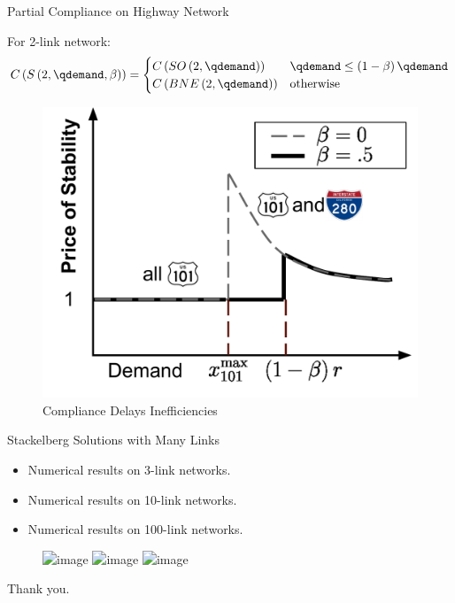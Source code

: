 \documentclass[xcolor=svgnames, english, smaller]{beamer}
\theoremstyle{plain}
\theoremstyle{definition}
\theoremstyle{plain}
\theoremstyle{plain}
\begin{document}
\begin{frame}{Partial Compliance on Highway Network}

For 2-link network:
\begin{equation}
C\left(S\left(2,\qdemand,\beta\right)\right) =
\begin{cases}
C\left(SO\left(2,\qdemand\right)\right) & \qdemand \le \left(1 - \beta\right)\qdemand \\
C\left(BNE\left(2,\qdemand\right)\right) & \text{otherwise}
\end{cases}
\end{equation}

\begin{figure}
\centering
\includegraphics[scale=0.25]{../../figures/presentation/POSNE2Link101280WithCompliance}
\caption{Compliance Delays Inefficiencies}
\end{figure}

\end{frame}

\begin{frame}{Stackelberg Solutions with Many Links}
\begin{itemize}
\item<1>Numerical results on 3-link networks.
\item<2>Numerical results on 10-link networks.
\item<3>Numerical results on 100-link networks.
\end{itemize}
\begin{figure}
\centering
\includegraphics<1>[scale=0.45]{../../figures/presentation/3links}
\includegraphics<2>[scale=0.45]{../../figures/presentation/10links}
\includegraphics<3>[scale=0.45]{../../figures/presentation/100links}
\end{figure}
\end{frame}

\begin{frame}

\large
\begin{center}
Thank you.
\end{center}
\end{frame}
\end{document}
